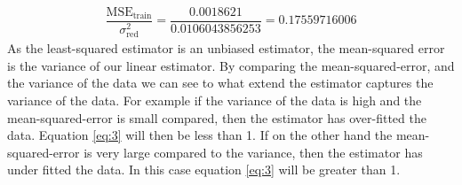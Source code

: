 \documentclass{article}
\begin{document}
\begin{align}
\dfrac{\text{MSE}_{\text{train}}}{\sigma^2_{\text{red}}} =
\dfrac{0.0018621}{0.0106043856253} = 0.17559716006
\label{eq:3}
\end{align}
As the least-squared estimator is an unbiased estimator, the mean-squared error is the variance of our linear estimator. By comparing the mean-squared-error, and the variance of the data we can see to what extend the estimator captures the variance of the data. For example if the variance of the data is high and the mean-squared-error is small compared, then the estimator has over-fitted the data. Equation \eqref{eq:3} will then be less than 1. If on the other hand the mean-squared-error is very large compared to the variance, then the estimator has under fitted the data. In this case equation \eqref{eq:3} will be greater than 1.
\end{document}
